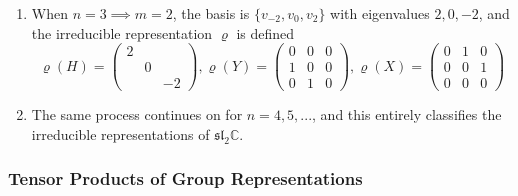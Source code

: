 \documentclass{article}
\begin{document}
\begin{enumerate}
      \item When $n=3 \implies m=2$, the basis is $\{v_{-2}, v_0, v_2\}$ with eigenvalues $2, 0, -2$, and the irreducible representation $\varrho$ is defined
        \begin{equation}
          \varrho(H) = \begin{pmatrix}
          2&&\\&0&\\&&-2
          \end{pmatrix}, \varrho(Y) = \begin{pmatrix}
          0&0&0\\1&0&0\\0&1&0
          \end{pmatrix}, \varrho(X) = \begin{pmatrix}
          0&1&0\\0&0&1\\0&0&0
          \end{pmatrix}
        \end{equation}

      \item The same process continues on for $n=4, 5, ...$, and this entirely classifies the irreducible representations of $\mathfrak{sl}_2 \mathbb{C}$. 
    \end{enumerate}

    \subsubsection{Tensor Products of Group Representations}
\end{document}
